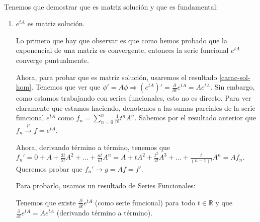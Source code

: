 \documentclass[11pt, a4paper,twoside]{article}
\makeatletter
\theoremstyle{theorem-style}  %
\renewenvironment{proof}[1][\proofname]{\par
	\pushQED{\qed}%
	\normalfont \topsep6\p@\@plus6\p@\relax
	\list{}{%
		\settowidth{\leftmargin}{\quad:\hskip\labelsep}%
		\setlength{\labelwidth}{0pt}%
		\setlength{\itemindent}{-\leftmargin}%
	}%
	\item[\hskip\labelsep\itshape#1\@addpunct{:}]\ignorespaces
}{%
	\popQED\endlist\@endpefalse
}
\theoremstyle{definition-style}
\theoremstyle{example-style}
\makeatother
\begin{document}
\begin{proof} \ \\
	Tenemos que demostrar que es matriz solución y que es fundamental:
	\begin{enumerate}[\quad i)]
		\item $ e^{tA} $ es matriz solución.
		
		 Lo primero que hay que observar es que como hemos probado que la exponencial de una matriz es convergente, entonces la serie funcional $ e^{tA} $ converge puntualmente.
		
		Ahora, para probar que es matriz solución, usaremos el resultado \ref{carac-sol-hom}. Tenemos que ver que $ \phi'=A\phi \Rightarrow  (e^{tA})'=\frac{\partial}{\partial t}e^{tA}=Ae^{tA}$. Sin embargo, como estamos trabajando con series funcionales, esto no es directo. Para ver claramente que estamos haciendo, denotemos a las sumas parciales de la serie funcional $ e^{tA} $ como $ f_n =\sum_{n=0}^{n} \frac{1}{n!}t^nA^n$. Sabemos por el resultado anterior que $ f_n \xrightarrow{p} f=e^{tA}$.
		
		Ahora, derivando término a término, tenemos que $ f_n'=0+A+ \frac{2t}{2!}A^2+\dots+\frac{nt}{n!}A^n =A+tA^2+\frac{t^2}{2!}A^3+\dots+\frac{t}{(n-1)!}A^n=Af_n $. Queremos probar que $ f_n'\rightarrow g=Af=f' $.
		
		Para probarlo, usamos un resultado de Series Funcionales:
		
		
		\noindent{}
		
		Tenemos que existe $ \frac{\partial}{\partial t}e^{tA}$ (como serie funcional) para todo $t \in \mathbb{R} $ y que $ \frac{\partial}{\partial t}e^{tA}=Ae^{tA} $ (derivando término a término). 
		

\end{enumerate}
\end{proof}
\end{document}
